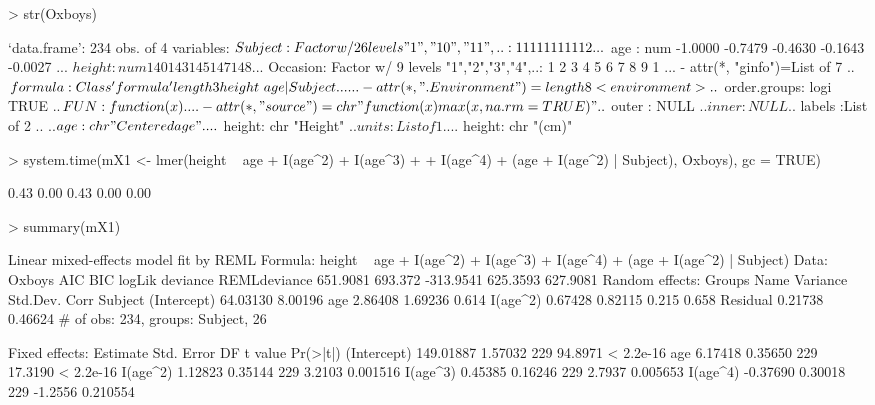 \documentclass[12pt]{article}
\begin{document}
\begin{Schunk}
\begin{Sinput}
> str(Oxboys)
\end{Sinput}
\begin{Soutput}
`data.frame':	234 obs. of  4 variables:
 $ Subject : Factor w/ 26 levels "1","10","11",..: 1 1 1 1 1 1 1 1 1 12 ...
 $ age     : num  -1.0000 -0.7479 -0.4630 -0.1643 -0.0027 ...
 $ height  : num  140 143 145 147 148 ...
 $ Occasion: Factor w/ 9 levels "1","2","3","4",..: 1 2 3 4 5 6 7 8 9 1 ...
 - attr(*, "ginfo")=List of 7
  ..$ formula     :Class 'formula' length 3 height ~ age | Subject
  .. .. ..- attr(*, ".Environment")=length 8 <environment> 
  ..$ order.groups: logi TRUE
  ..$ FUN         :function (x)  
  .. ..- attr(*, "source")= chr "function (x) max(x, na.rm = TRUE)"
  ..$ outer       : NULL
  ..$ inner       : NULL
  ..$ labels      :List of 2
  .. ..$ age   : chr "Centered age"
  .. ..$ height: chr "Height"
  ..$ units       :List of 1
  .. ..$ height: chr "(cm)"
\end{Soutput}
\begin{Sinput}
> system.time(mX1 <- lmer(height ~ age + I(age^2) + I(age^3) + 
+     I(age^4) + (age + I(age^2) | Subject), Oxboys), gc = TRUE)
\end{Sinput}
\begin{Soutput}
[1] 0.43 0.00 0.43 0.00 0.00
\end{Soutput}
\begin{Sinput}
> summary(mX1)
\end{Sinput}
\begin{Soutput}
Linear mixed-effects model fit by REML
Formula: height ~ age + I(age^2) + I(age^3) + I(age^4) + (age + I(age^2) |      Subject) 
   Data: Oxboys 
      AIC     BIC    logLik deviance REMLdeviance
 651.9081 693.372 -313.9541 625.3593     627.9081
Random effects:
 Groups   Name        Variance Std.Dev. Corr        
 Subject  (Intercept) 64.03130 8.00196              
          age          2.86408 1.69236  0.614       
          I(age^2)     0.67428 0.82115  0.215 0.658 
 Residual              0.21738 0.46624              
# of obs: 234, groups: Subject, 26

Fixed effects:
             Estimate Std. Error  DF t value  Pr(>|t|)
(Intercept) 149.01887    1.57032 229 94.8971 < 2.2e-16
age           6.17418    0.35650 229 17.3190 < 2.2e-16
I(age^2)      1.12823    0.35144 229  3.2103  0.001516
I(age^3)      0.45385    0.16246 229  2.7937  0.005653
I(age^4)     -0.37690    0.30018 229 -1.2556  0.210554


\end{Soutput}
\end{Schunk}
\end{document}
